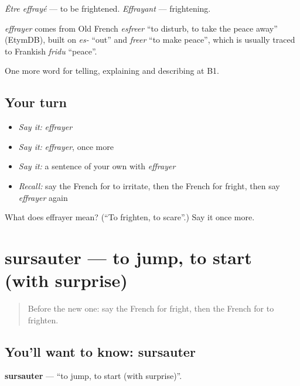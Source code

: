 \emph{Être effrayé} — to be frightened. \emph{Effrayant} — frightening.

\begin{cousinweb}
\emph{effrayer} comes from Old French \emph{esfreer} \textquotedblleft{}to disturb, to take the peace away\textquotedblright{} (EtymDB), built on \emph{es-} \textquotedblleft{}out\textquotedblright{} and \emph{freer} \textquotedblleft{}to make peace\textquotedblright{}, which is usually traced to Frankish \emph{fridu} \textquotedblleft{}peace\textquotedblright{}.
\end{cousinweb}

\begin{grammarlens}[title={What you've built}]
One more word for telling, explaining and describing at B1.
\end{grammarlens}

\subsection*{Your turn}
\begin{itemize}
\raggedright
  \item \emph{Say it:} \emph{effrayer}
  \item \emph{Say it:} \emph{effrayer}, once more
  \item \emph{Say it:} a sentence of your own with \emph{effrayer}
  \item \emph{Recall:} say the French for to irritate, then the French for fright, then say \emph{effrayer} again
\end{itemize}

\begin{tcolorbox}[breakable,colback=teal!4,colframe=teal!35!black,title={Before you move on}]
What does effrayer mean? (\textquotedblleft{}To frighten, to scare\textquotedblright{}.) Say it once more.
\end{tcolorbox}
\section[sursauter]{sursauter — to jump, to start (with surprise)}

\label{lesson:FR-C470-sursauter}



\begin{quote}
Before the new one: say the French for fright, then the French for to frighten.
\end{quote}

\subsection*{You'll want to know: sursauter}
\textbf{sursauter} — \textquotedblleft{}to jump, to start (with surprise)\textquotedblright{}.

